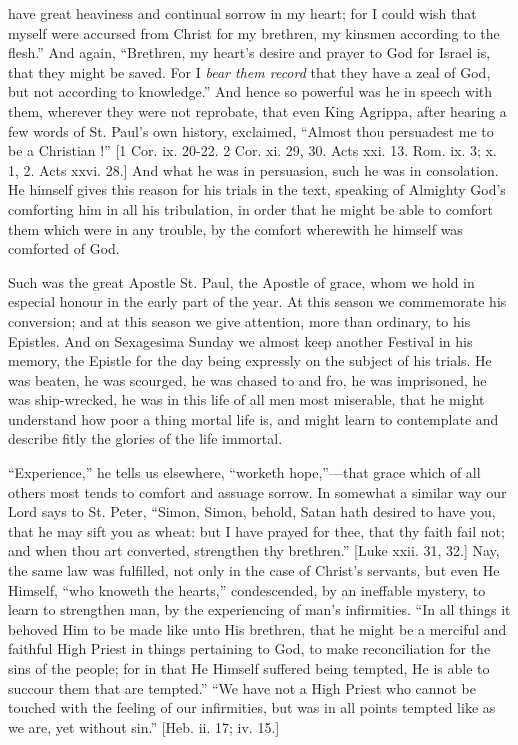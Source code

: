 have great heaviness and continual sorrow in my heart; for I could
wish that myself were accursed from Christ for my brethren, my kinsmen
according to the flesh.'' And again, ``Brethren, my heart's
desire and prayer to God for Israel is, that they might be saved. For
I \emph{bear them record} that they have a zeal of God, but not
according to knowledge.'' And hence so powerful was he in speech
with them, wherever they were not reprobate, that even King Agrippa,
after hearing a few words of St. Paul's own history, exclaimed,
``Almost thou persuadest me to be a Christian !'' [1 Cor. ix.
20-22. 2 Cor. xi. 29, 30. Acts xxi. 13. Rom. ix. 3; x. 1, 2. Acts xxvi.
28.] And what he was in persuasion, such he was in consolation. He
himself gives this reason for his trials in the text, speaking of
Almighty God's comforting him in all his tribulation, in order that he
might be able to comfort them which were in any trouble, by the
comfort wherewith he himself was comforted of God.

Such was the great Apostle St. Paul, the Apostle of grace, whom we
hold in especial honour in the early part of the year. At this season
we commemorate his conversion; and at this season we give attention,
more than ordinary, to his Epistles. And on Sexagesima Sunday we
almost keep another Festival in his memory, the Epistle for the day
being expressly on the subject of his trials. He was beaten, he was
scourged, he was chased to and fro, he was imprisoned, he was
ship-wrecked, he was in this life of all men most miserable, that he
might understand how poor a thing mortal life is, and might learn to
contemplate and describe fitly the glories of the life immortal.

``Experience,'' he tells us elsewhere, ``worketh
hope,''—that grace which of all others most tends to comfort and
assuage sorrow. In somewhat a similar way our Lord says to St. Peter,
``Simon, Simon, behold, Satan hath desired to have you, that he
may sift you as wheat: but I have prayed for thee, that thy faith fail
not; and when thou art converted, strengthen thy brethren.'' [Luke
xxii. 31, 32.] Nay, the same law was fulfilled, not only in the case
of Christ's servants, but even He Himself, ``who knoweth the
hearts,'' condescended, by an ineffable mystery, to learn to
strengthen man, by the experiencing of man's infirmities. ``In
all things it behoved Him to be made like unto His brethren, that he
might be a merciful and faithful High Priest in things pertaining to
God, to make reconciliation for the sins of the people; for in that He
Himself suffered being tempted, He is able to succour them that are
tempted.'' ``We have not a High Priest who cannot be touched
with the feeling of our infirmities, but was in all points tempted
like as we are, yet without sin.'' [Heb. ii. 17; iv. 15.]

